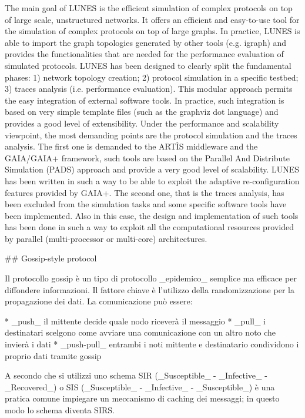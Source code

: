 The main goal of LUNES is the efficient simulation of complex protocols on top of large scale, unstructured networks. It offers an efficient and easy-to-use tool for the simulation of complex protocols on top of large graphs. In practice, LUNES is able to import the graph topologies generated by other tools (e.g. igraph) and provides the functionalities that are needed for the performance evaluation of simulated protocols. LUNES has been designed to clearly split the fundamental phases: 1) network topology creation; 2) protocol simulation in a specific testbed; 3) traces analysis (i.e. performance evaluation). This modular approach permits the easy integration of external software tools. In practice, such integration is based on very simple template files (such as the graphviz dot language) and provides a good level of extensibility. Under the performance and scalability viewpoint, the most demanding points are the protocol simulation and the traces analysis. The first one is demanded to the ARTÌS middleware and the GAIA/GAIA+ framework, such tools are based on the Parallel And Distribute Simulation (PADS) approach and provide a very good level of scalability. LUNES has been written in such a way to be able to exploit the adaptive re-configuration features provided by GAIA+. The second one, that is the traces analysis, has been excluded from the simulation tasks and some specific software tools have been implemented. Also in this case, the design and implementation of such tools has been done in such a way to exploit all the computational resources provided by parallel (multi-processor or multi-core) architectures.

## Gossip-style protocol

Il protocollo gossip è un tipo di protocollo \_epidemico\_ semplice ma efficace per diffondere informazioni. Il fattore chiave è l'utilizzo della randomizzazione per la propagazione dei dati.
La comunicazione può essere:

* \_push\_ il mittente decide quale nodo riceverà il messaggio
* \_pull\_ i destinatari scelgono come avviare una comunicazione con un altro noto che invierà i dati
* \_push-pull\_ entrambi i noti mittente e destinatario condividono i proprio dati tramite gossip

A secondo che si utilizzi uno schema SIR (\_Susceptible\_ - \_Infective\_ - \_Recovered\_) o SIS (\_Susceptible\_ - \_Infective\_ - \_Susceptible\_) è una pratica comune impiegare un meccanismo di caching dei messaggi; in questo modo lo schema diventa SIRS.

